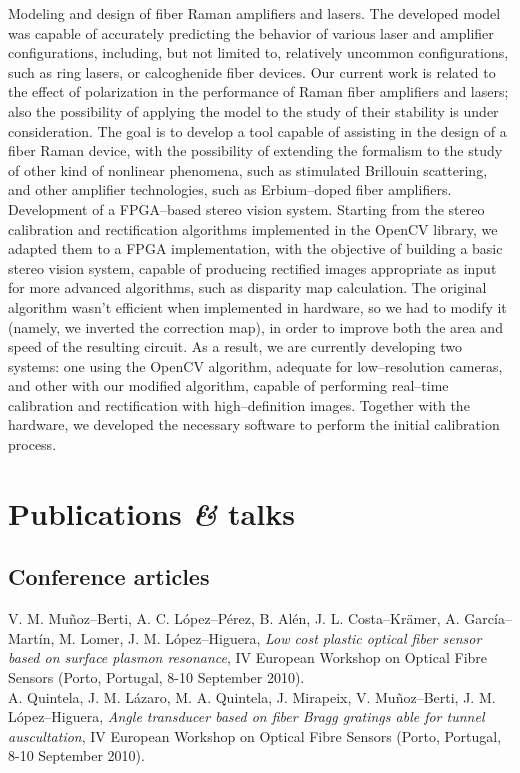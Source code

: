 \documentclass[11pt, a4paper]{article}
\newcommand{\amper}
           {{\fontspec[Scale=.95]
                      {Adobe Caslon Pro}\selectfont\itshape\&}}
\newcommand{\years}[1]{\marginnote{\scriptsize #1}}
\begin{document}
\years{2010--present}Modeling and design of fiber Raman amplifiers and lasers. The developed model was capable of accurately predicting the behavior of various laser and amplifier configurations, including, but not limited to, relatively uncommon configurations, such as ring lasers, or calcoghenide fiber devices. Our current work is related to the effect of polarization in the performance of Raman fiber amplifiers and lasers; also the possibility of applying the model to the study of their stability is under consideration. The goal is to develop a tool capable of assisting in the design of a fiber Raman device, with the possibility of extending the formalism to the study of other kind of nonlinear phenomena, such as stimulated Brillouin scattering, and other amplifier technologies, such as Erbium--doped fiber amplifiers.\\
\years{2011--present}Development of a FPGA--based stereo vision system. Starting from the stereo calibration and rectification algorithms implemented in the OpenCV library, we adapted them to a FPGA implementation, with the objective of building a basic stereo vision system, capable of producing rectified images appropriate as input for more advanced algorithms, such as disparity map calculation. The original algorithm wasn't efficient when implemented in hardware, so we had to modify it (namely, we inverted the correction map), in order to improve both the area and speed of the resulting circuit. As a result, we are currently developing two systems: one using the OpenCV algorithm, adequate for low--resolution cameras, and other with our modified algorithm, capable of performing real--time calibration and rectification with high--definition images. Together with the hardware, we developed the necessary software to perform the initial calibration process.\\


\section*{Publications \amper{} talks} %

\subsection*{Conference articles}
\noindent
\years{2010}V. M. Muñoz--Berti, A. C. López--Pérez, B. Alén, J. L. Costa--Krämer, A. García--Martín, M. Lomer, J. M. López--Higuera, \textit{Low cost plastic optical fiber sensor based on surface plasmon resonance}, IV European Workshop on Optical Fibre Sensors (Porto, Portugal, 8-10 September 2010).\\
\years{2010}A. Quintela, J. M. Lázaro, M. A. Quintela, J. Mirapeix, V. Muñoz--Berti, J. M. López--Hi\-gue\-ra, \textit{Angle transducer based on fiber Bragg gratings able for tunnel auscultation}, IV European Workshop on Optical Fibre Sensors (Porto, Portugal, 8-10 September 2010).
\end{document}
